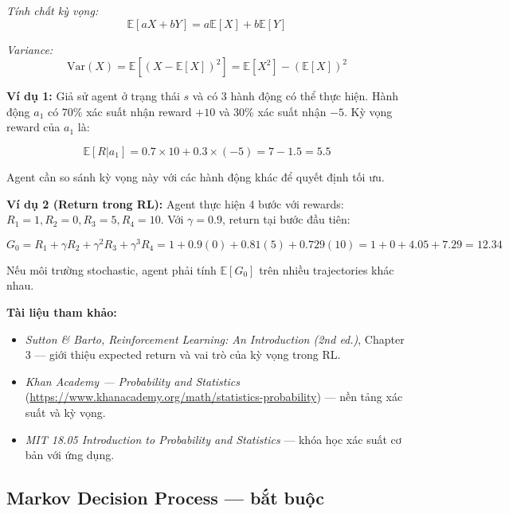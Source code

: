 \documentclass[12pt,a4paper]{article}
\begin{document}
\textit{Tính chất kỳ vọng:}
\begin{equation}
\mathbb{E}[aX + bY] = a\mathbb{E}[X] + b\mathbb{E}[Y]
\end{equation}

\textit{Variance:}
\begin{equation}
\text{Var}(X) = \mathbb{E}[(X - \mathbb{E}[X])^2] = \mathbb{E}[X^2] - (\mathbb{E}[X])^2
\end{equation}

\textbf{Ví dụ 1:} Giả sử agent ở trạng thái $s$ và có 3 hành động có thể thực hiện. Hành động $a_1$ có 70\% xác suất nhận reward $+10$ và 30\% xác suất nhận $-5$. Kỳ vọng reward của $a_1$ là:

\begin{equation}
\mathbb{E}[R|a_1] = 0.7 \times 10 + 0.3 \times (-5) = 7 - 1.5 = 5.5
\end{equation}

Agent cần so sánh kỳ vọng này với các hành động khác để quyết định tối ưu.

\textbf{Ví dụ 2 (Return trong RL):} Agent thực hiện 4 bước với rewards: $R_1=1, R_2=0, R_3=5, R_4=10$. Với $\gamma=0.9$, return tại bước đầu tiên:

\begin{equation}
G_0 = R_1 + \gamma R_2 + \gamma^2 R_3 + \gamma^3 R_4 = 1 + 0.9(0) + 0.81(5) + 0.729(10) = 1 + 0 + 4.05 + 7.29 = 12.34
\end{equation}

Nếu môi trường stochastic, agent phải tính $\mathbb{E}[G_0]$ trên nhiều trajectories khác nhau.

\textbf{Tài liệu tham khảo:}
\begin{itemize}[leftmargin=1.5em]
    \item \textit{Sutton \& Barto, Reinforcement Learning: An Introduction (2nd ed.)}, Chapter 3 --- giới thiệu expected return và vai trò của kỳ vọng trong RL.
    \item \textit{Khan Academy --- Probability and Statistics} (\url{https://www.khanacademy.org/math/statistics-probability}) --- nền tảng xác suất và kỳ vọng.
    \item \textit{MIT 18.05 Introduction to Probability and Statistics} --- khóa học xác suất cơ bản với ứng dụng.
\end{itemize}

\subsection{Markov Decision Process --- bắt buộc}
\end{document}
